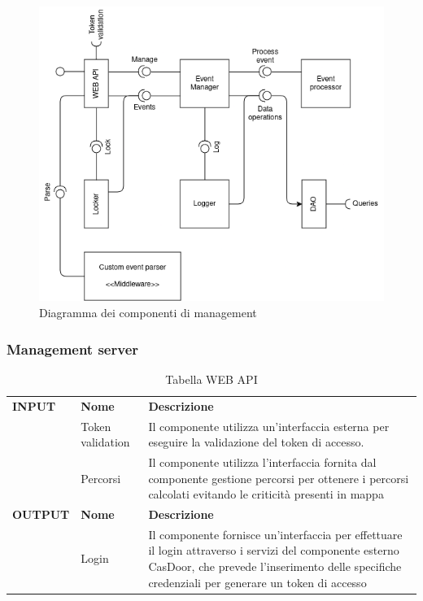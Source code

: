 \documentclass{article}
\begin{document}
\begin{figure}[htbp]
    \centering
    \includegraphics[width=1\textwidth]{Images/ManagementServer - Component.png}
    \caption{Diagramma dei componenti di management}
    \label{fig:management-component-diagram}
\end{figure}

\subsubsection{Management server}

\begin{table}[htbp]
    \centering
    \renewcommand{\arraystretch}{1.3} %
    \begin{tabularx}{\textwidth}{| l | l | X |}
        \Xhline{2pt}
        \textbf{INPUT} & \textbf{Nome} & \textbf{Descrizione} \\
        \Xhline{2pt}
         & Token validation & Il componente utilizza un'interfaccia esterna per eseguire la validazione del token di accesso. \\
        \hline
         & Percorsi & Il componente utilizza l'interfaccia fornita dal componente gestione percorsi per ottenere i percorsi calcolati evitando le criticità presenti in mappa \\
        \Xhline{2pt}
        \textbf{OUTPUT} & \textbf{Nome} & \textbf{Descrizione} \\
        \Xhline{2pt}
         & Login & Il componente fornisce un'interfaccia per effettuare il login attraverso i servizi del componente esterno CasDoor, che prevede l'inserimento delle specifiche credenziali per generare un token di accesso \\
        \hline
    \end{tabularx}
    \caption{Tabella WEB API}
\end{table}
\end{document}
